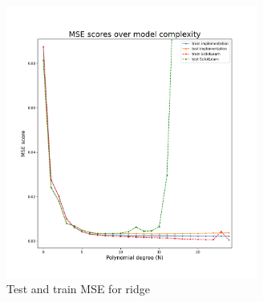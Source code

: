 \documentclass[twocolumn,10pt,cleanfoot]{asme2ej}
\begin{document}
\begin{figure}[h]
\centerline{\includegraphics[width=3.25in]{figure/frankebestlambdamse.png}}
\caption{Test and train MSE for ridge}
\label{frankebestlambdamse}
\end{figure}


\end{document}
